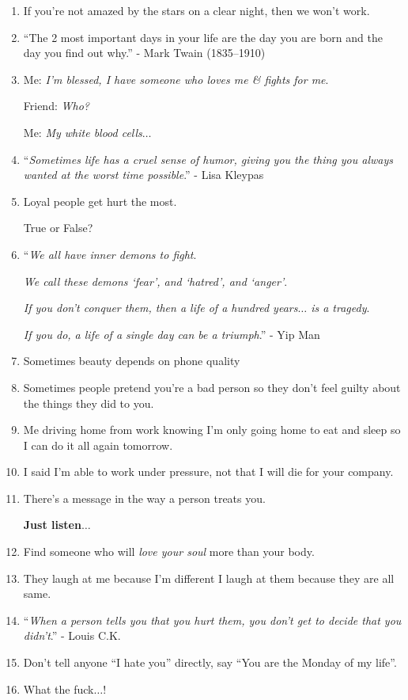 \documentclass{article}
\numberwithin{equation}{section}
\begin{document}
\begin{enumerate}
    Because I am.
    
    That's how I function.
    
    I don't ask others ``\textit{Why are you so noisy?}
    
    \textit{Why do you talk so much?}''
    
    It's rude.
    \item If you're not amazed by the stars on a clear night, then we won't work.
    \item ``The 2 most important days in your life are the day you are born and the day you find out why.'' - Mark Twain (1835--1910)
    \item Me: \textit{I'm blessed, I have someone who loves me \& fights for me}.
    
    Friend: \textit{Who?}
    
    Me: \textit{My white blood cells}$\ldots$
    \item ``\textit{Sometimes life has a cruel sense of humor, giving you the thing you always wanted at the worst time possible}.'' - Lisa Kleypas
    \item Loyal people get hurt the most.
    
    True or False?
    \item ``\textit{We all have inner demons to fight}.
    
    \textit{We call these demons `fear', and `hatred', and `anger'}.
    
    \textit{If you don't conquer them, then a life of a hundred years$\ldots$ is a tragedy}.
    
    \textit{If you do, a life of a single day can be a triumph}.'' - Yip Man
    \item Sometimes beauty depends on phone quality
    \item Sometimes people pretend you're a bad person so they don't feel guilty about the things they did to you.
    \item Me driving home from work knowing I'm only going home to eat and sleep so I can do it all again tomorrow.
    \item I said I'm able to work under pressure, not that I will die for your company.
    \item There's a message in the way a person treats you.
    
    \textbf{Just listen$\ldots$}
    \item Find someone who will \textit{love your soul} more than your body.
    \item They laugh at me because I'm different I laugh at them because they are all same.
    \item ``\textit{When a person tells you that you hurt them, you don't get to decide that you didn't}.'' - Louis C.K.
    \item Don't tell anyone ``I hate you'' directly, say ``You are the Monday of my life''.
    \item What the fuck$\ldots$!
    

\end{enumerate}
\end{document}
